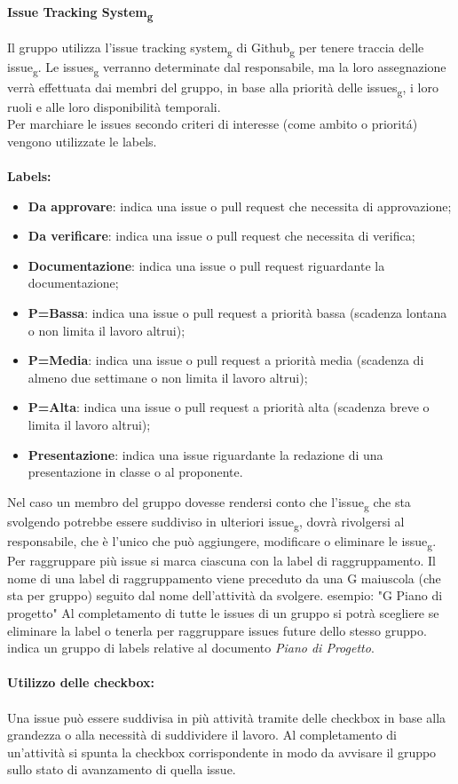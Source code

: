 \paragraph{Issue Tracking System\textsubscript{g}}
Il gruppo utilizza l'issue tracking system\textsubscript{g} di Github\textsubscript{g} per tenere traccia delle issue\textsubscript{g}. 
Le issues\textsubscript{g} verranno determinate dal responsabile, ma la loro assegnazione verrà effettuata dai membri del gruppo, in base alla priorità delle issues\textsubscript{g}, i loro ruoli e alle loro disponibilità temporali.\\
Per marchiare le issues secondo criteri di interesse (come ambito o prioritá) vengono utilizzate le labels.
\\\\\textbf{Labels:}
\begin{itemize}
	\item \textbf{Da approvare}: indica una issue o pull request che necessita di approvazione;
	\item \textbf{Da verificare}: indica una issue o pull request che necessita di verifica;
	\item \textbf{Documentazione}: indica una issue o pull request riguardante la documentazione;
	\item \textbf{P=Bassa}: indica una issue o pull request a priorità bassa (scadenza lontana o non limita il lavoro altrui);
	\item \textbf{P=Media}: indica una issue o pull request a priorità media (scadenza di almeno due settimane o non limita il lavoro altrui);
	\item \textbf{P=Alta}: indica una issue o pull request a priorità alta (scadenza breve o limita il lavoro altrui);
	\item \textbf{Presentazione}: indica una issue riguardante la redazione di una presentazione in classe o al proponente.
\end{itemize}

Nel caso un membro del gruppo dovesse rendersi conto che l'issue\textsubscript{g} che sta svolgendo potrebbe essere suddiviso in ulteriori issue\textsubscript{g}, dovrà rivolgersi al responsabile, che è l'unico che può aggiungere, modificare o eliminare le issue\textsubscript{g}.\\
Per raggruppare più issue si marca ciascuna con la label di raggruppamento.
Il nome di una label di raggruppamento viene preceduto da una G maiuscola (che sta per gruppo) seguito dal nome dell'attività da svolgere. esempio: "G Piano di progetto"
Al completamento di tutte le issues di un gruppo si potrà scegliere se eliminare la label o tenerla per raggruppare issues future dello stesso gruppo.
indica un gruppo di labels relative al documento \textit{Piano di Progetto}.
\\\\
\textbf{Utilizzo delle checkbox:}
\\\\
Una issue può essere suddivisa in più attività tramite delle checkbox in base alla grandezza o
alla necessità di suddividere il lavoro. Al completamento di un'attività si spunta la checkbox
corrispondente in modo da avvisare il gruppo sullo stato di avanzamento di quella issue.